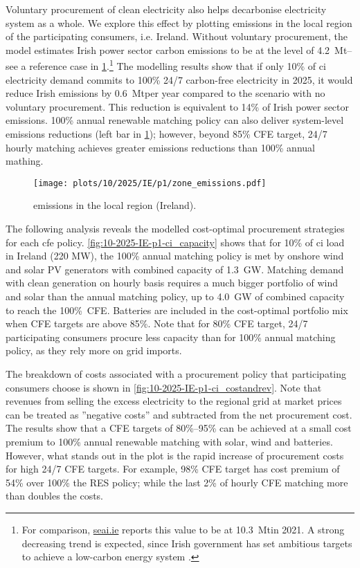 Voluntary procurement of clean electricity also helps decarbonise electricity system as a whole.
We explore this effect by plotting \co emissions in the local region of the participating consumers, i.e. Ireland.
Without voluntary procurement, the model estimates Irish power sector carbon emissions to be at the level of 4.2~Mt\co -- see a reference case in \cref{fig:10-2025-IE-p1-zone_emissions}.\footnote{For comparison, \href{https://www.seai.ie/data-and-insights/seai-statistics/key-publications/co2-emissions-report/}{seai.ie} reports this value to be at 10.3~Mt\co in 2021. A strong decreasing trend is expected, since Irish government has set ambitious targets to achieve a low-carbon energy system \cite{SEAI}.}
The modelling results show that if only 10\% of \gls{ci} electricity demand commits to 100\% 24/7 carbon-free electricity in 2025, it would reduce Irish emissions by 0.6~Mt\co per year compared to the scenario with no voluntary procurement.
This reduction is equivalent to 14\% of Irish power sector emissions.
100\% annual renewable matching policy can also deliver system-level \co emissions reductions (left bar in \cref{fig:10-2025-IE-p1-zone_emissions}); however, beyond 85\% CFE target, 24/7 hourly matching achieves greater emissions reductions than 100\% annual mathing.

\begin{figure}
    \centering
    \texttt{[image: plots/10/2025/IE/p1/zone\_emissions.pdf]}
    \caption{\co emissions in the local region (Ireland).}
    \label{fig:10-2025-IE-p1-zone_emissions}
\end{figure}

The following analysis reveals the modelled cost-optimal procurement strategies for each \gls{cfe} policy.
\cref{fig:10-2025-IE-p1-ci_capacity} shows that for 10\% of \gls{ci} load in Ireland (220 MW), the 100\% annual matching policy is met by onshore wind and solar PV generators with combined capacity of 1.3~GW.
Matching demand with clean generation on hourly basis requires a much bigger portfolio of wind and solar than the annual matching policy, up to 4.0~GW of combined capacity to reach the 100\%~CFE.
Batteries are included in the cost-optimal portfolio mix when CFE targets are above 85\%.
Note that for 80\% CFE target, 24/7 participating consumers procure less capacity than for 100\% annual matching policy, as they rely more on grid imports.

The breakdown of costs associated with a procurement policy that participating consumers choose is shown in \cref{fig:10-2025-IE-p1-ci_costandrev}.
Note that revenues from selling the excess electricity to the regional grid at market prices can be treated as ”negative costs” and subtracted from the net procurement cost.
The results show that a CFE targets of 80\%--95\% can be achieved at a small cost premium to 100\% annual renewable matching with solar, wind and batteries.
However, what stands out in the plot is the rapid increase of procurement costs for high 24/7 CFE targets. 
For example, 98\% CFE target has cost premium of 54\% over 100\% the RES policy; while the last 2\% of hourly CFE matching more than doubles the costs.

